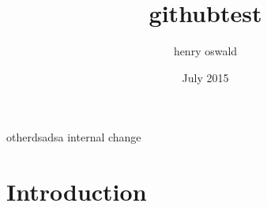 \documentclass{article}
\title{githubtest}
\author{henry oswald}
\date{July 2015}
\begin{document}
\maketitle
otherdsadsa
internal change

\section{Introduction}
\end{document}

